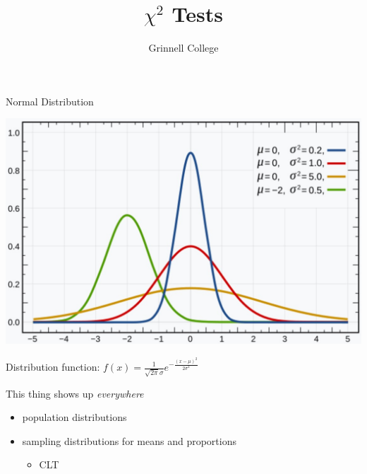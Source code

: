 \documentclass{beamer}
\title[Introduction to Statistics]{$\chi^2$ Tests}
\subtitle{}
\author{Grinnell College}
\date{}
\begin{document}
\begin{frame}
  \titlepage
\end{frame}

\begin{frame}{Normal Distribution}
\begin{center}
    \includegraphics[scale=.4]{img/normaldist.jpg}
\end{center}
Distribution function: $f(x) = \frac{1}{\sqrt{2\pi}\sigma}e^{-\frac{(x-\mu)^2}{2\sigma^2}}$ \vspace{2mm}

This thing shows up \textit{everywhere}
\begin{itemize}
    \item population distributions
    \item sampling distributions for means and proportions
    \begin{itemize}
        \item CLT
    \end{itemize}
\end{itemize}
\end{frame}
\end{document}
